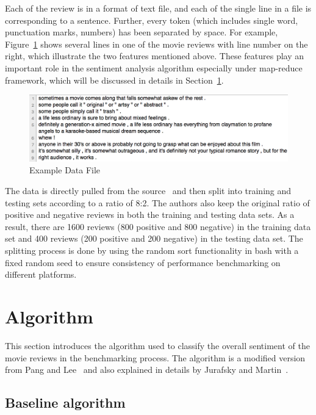 Each of the review is in a format of text file, and each of the single line in a 
file is corresponding to a sentence. Further, every token (which includes 
single word, punctuation marks, numbers) has been separated by space. For 
example, Figure~\ref{f:data} shows several lines in one of the movie reviews 
with line number on the right, which illustrate the two features mentioned 
above. These features play an important role in the sentiment analysis 
algorithm especially under map-reduce framework, which will be discussed in 
details in Section~\ref{s:algorithm}.
\begin{figure}[!ht]
	\centering\includegraphics[width=\columnwidth]{images/polarity-data.png}
	\caption{Example Data File}
	\label{f:data}
\end{figure}

The data is directly pulled from the 
source~\cite{hid-sp18-405-sentiment-data} and then split into training and 
testing sets according to a ratio of 8:2. The authors also keep the original 
ratio of positive and negative reviews in both the training and testing data 
sets. As a result, there are 1600 reviews (800 positive and 800 negative) in 
the training data set and 400 reviews (200 positive and 200 negative) in the 
testing data set. The splitting process is done by using the random sort 
functionality in bash with a fixed random seed to ensure consistency of 
performance benchmarking on different platforms. 


\section{Algorithm}
\label{s:algorithm}

This section introduces the algorithm used to classify the overall sentiment 
of the movie reviews in the benchmarking process. The algorithm is a 
modified version from Pang and 
Lee~\cite{hid-sp18-405-sentiment-pang2004asentimental} and also 
explained in details by Jurafsky and 
Martin~\cite{hid-sp18-405-sentiment-jurafsky2009}. 

\subsection{Baseline algorithm}
\label{ss:base}

